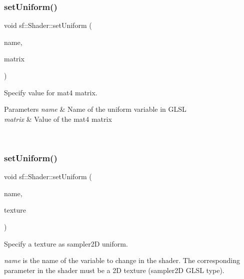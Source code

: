 \subsubsection{\texorpdfstring{setUniform()}{setUniform()}\hspace{0.1cm}{\footnotesize\ttfamily [14/16]}}
{\footnotesize\ttfamily void sf\+::\+Shader\+::set\+Uniform (\begin{DoxyParamCaption}\item[{const std\+::string \&}]{name,  }\item[{const \mbox{\hyperlink{structsf_1_1priv_1_1_matrix}{Glsl\+::\+Mat4}} \&}]{matrix }\end{DoxyParamCaption})}



Specify value for {\ttfamily mat4} matrix. 


\begin{DoxyParams}{Parameters}
{\em name} & Name of the uniform variable in G\+L\+SL \\
\hline
{\em matrix} & Value of the mat4 matrix \begin{DoxyVerb}\end{DoxyVerb}
 \\
\hline
\end{DoxyParams}
\mbox{\label{classsf_1_1_shader_a7806a29ffbd0ee9251256a9e7265d479}} 
\subsubsection{\texorpdfstring{setUniform()}{setUniform()}\hspace{0.1cm}{\footnotesize\ttfamily [15/16]}}
{\footnotesize\ttfamily void sf\+::\+Shader\+::set\+Uniform (\begin{DoxyParamCaption}\item[{const std\+::string \&}]{name,  }\item[{const \mbox{\hyperlink{classsf_1_1_texture}{Texture}} \&}]{texture }\end{DoxyParamCaption})}



Specify a texture as {\ttfamily sampler2D} uniform. 

{\itshape name} is the name of the variable to change in the shader. The corresponding parameter in the shader must be a 2D texture ({\ttfamily sampler2D} G\+L\+SL type).


